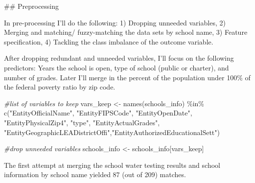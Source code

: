 \documentclass[
]{article}
\newenvironment{Shaded}{\begin{snugshade}}{\end{snugshade}}
\newcommand{\CommentTok}[1]{\textcolor[rgb]{0.56,0.35,0.01}{\textit{#1}}}
\newcommand{\FunctionTok}[1]{\textcolor[rgb]{0.00,0.00,0.00}{#1}}
\newcommand{\NormalTok}[1]{#1}
\newcommand{\OtherTok}[1]{\textcolor[rgb]{0.56,0.35,0.01}{#1}}
\newcommand{\SpecialCharTok}[1]{\textcolor[rgb]{0.00,0.00,0.00}{#1}}
\newcommand{\StringTok}[1]{\textcolor[rgb]{0.31,0.60,0.02}{#1}}
\begin{document}
\#\# Preprocessing

In pre-processing I'll do the following: 1) Dropping unneeded variables,
2) Merging and matching/ fuzzy-matching the data sets by school name, 3)
Feature specification, 4) Tackling the class imbalance of the outcome
variable.

After dropping redundant and unneeded variables, I'll focus on the
following predictors: Years the school is open, type of school (public
or charter), and number of grades. Later I'll merge in the percent of
the population under 100\% of the federal poverty ratio by zip code.

\begin{Shaded}
\begin{Highlighting}[]
\CommentTok{\#list of variables to keep}
\NormalTok{vars\_keep }\OtherTok{\textless{}{-}} \FunctionTok{names}\NormalTok{(schools\_info) }\SpecialCharTok{\%in\%} \FunctionTok{c}\NormalTok{(}\StringTok{"EntityOfficialName"}\NormalTok{, }\StringTok{"EntityFIPSCode"}\NormalTok{, }\StringTok{"EntityOpenDate"}\NormalTok{, }\StringTok{"EntityPhysicalZip4"}\NormalTok{, }\StringTok{"type"}\NormalTok{,}
                                        \StringTok{"EntityActualGrades"}\NormalTok{, }\StringTok{"EntityGeographicLEADistrictOffi"}\NormalTok{,}\StringTok{"EntityAuthorizedEducationalSett"}\NormalTok{)}

\CommentTok{\#drop unneeded variables}
\NormalTok{schools\_info }\OtherTok{\textless{}{-}}\NormalTok{ schools\_info[vars\_keep]}
\end{Highlighting}
\end{Shaded}

The first attempt at merging the school water testing results and school
information by school name yielded 87 (out of 209) matches.
\end{document}

